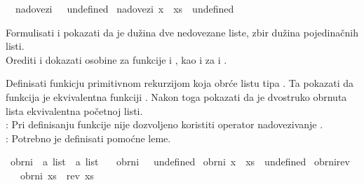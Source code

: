 \begin{isabellebody}
\begin{exercise}[subtitle=Algebarski tip podataka: lista.]
\ \ {\isachardoublequoteopen}nadovezi\ {\isacharbrackleft}{\kern0pt}{\isacharbrackright}{\kern0pt}\ {\isacharequal}{\kern0pt}\ undefined{\isachardoublequoteclose}\isanewline
{\isacharbar}{\kern0pt}\ {\isachardoublequoteopen}nadovezi\ {\isacharparenleft}{\kern0pt}x\ {\isacharhash}{\kern0pt}\ xs{\isacharparenright}{\kern0pt}\ {\isacharequal}{\kern0pt}\ undefined{\isachardoublequoteclose}%
\begin{isamarkuptext}%
Formulisati i pokazati da je dužina dve nedovezane liste, zbir dužina pojedinačnih listi.\\
      Orediti i dokazati osobine za funkcije  i , kao i za  i .%
\end{isamarkuptext}\isamarkuptrue%
%
\begin{isamarkuptext}%
Definisati funkicju  primitivnom rekurzijom
      koja obrće listu tipa . 
      Ta pokazati da funkcija je  ekvivalentna funkciji .
      Nakon toga pokazati da je dvostruko obrnuta lista
      ekvivalentna početnoj listi.\\
      : Pri definisanju funkcije  nije dozvoljeno 
                  koristiti operator nadovezivanje \isa{{\isacharat}{\kern0pt}}.\\
      : Potrebno je definisati pomoćne leme.%
\end{isamarkuptext}\isamarkuptrue%
\isamarkupfalse%
\ obrni\ {\isacharcolon}{\kern0pt}{\isacharcolon}{\kern0pt}\ {\isachardoublequoteopen}{\isacharprime}{\kern0pt}a\ list\ {\isasymRightarrow}\ {\isacharprime}{\kern0pt}a\ list{\isachardoublequoteclose}\ \isanewline
\ \ {\isachardoublequoteopen}obrni\ {\isacharbrackleft}{\kern0pt}{\isacharbrackright}{\kern0pt}\ {\isacharequal}{\kern0pt}\ undefined{\isachardoublequoteclose}\isanewline
{\isacharbar}{\kern0pt}\ {\isachardoublequoteopen}obrni\ {\isacharparenleft}{\kern0pt}x\ {\isacharhash}{\kern0pt}\ xs{\isacharparenright}{\kern0pt}\ {\isacharequal}{\kern0pt}\ undefined{\isachardoublequoteclose}\isanewline
\isanewline
{}\isamarkupfalse%
\ obrni{\isacharunderscore}{\kern0pt}rev{\isacharcolon}{\kern0pt}\ \isanewline
\ \ \ {\isachardoublequoteopen}obrni\ xs\ {\isacharequal}{\kern0pt}\ rev\ xs{\isachardoublequoteclose}\isanewline
\ \ %
\isadelimproof
%
\endisadelimproof

\end{exercise}
\end{isabellebody}
